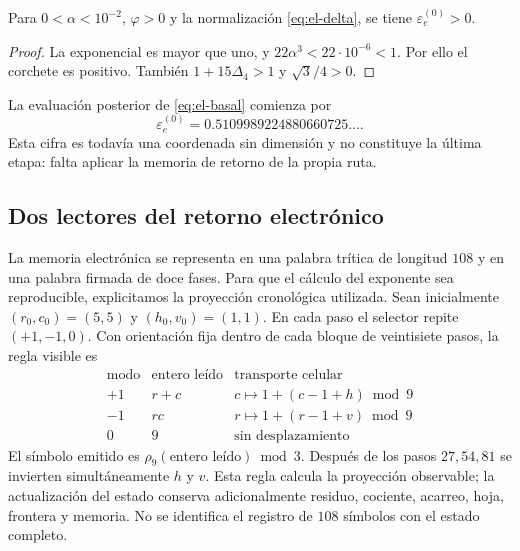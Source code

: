 \begin{proposition}
Para \(0<\alpha<10^{-2}\), \(\varphi>0\) y la normalización
\eqref{eq:el-delta}, se tiene \(\varepsilon_e^{(0)}>0\).
\end{proposition}
\begin{proof}
La exponencial es mayor que uno, y
\(22\alpha^3<22\cdot10^{-6}<1\). Por ello el corchete es positivo.
También \(1+15\Delta_4>1\) y \(\sqrt3/4>0\).
\end{proof}

La evaluación posterior de \eqref{eq:el-basal} comienza por
\[
 \varepsilon_e^{(0)}=0.5109989224880660725\ldots.
\]
Esta cifra es todavía una coordenada sin dimensión y no constituye la
última etapa: falta aplicar la memoria de retorno de la propia ruta.

\subsection{Dos lectores del retorno electrónico}

La memoria electrónica se representa en una palabra trítica de longitud
\(108\) y en una palabra firmada de doce fases. Para que el cálculo del
exponente sea reproducible, explicitamos la proyección cronológica
utilizada. Sean inicialmente
\((r_0,c_0)=(5,5)\) y \((h_0,v_0)=(1,1)\). En cada paso el selector
repite \((+1,-1,0)\). Con orientación fija dentro de cada bloque de
veintisiete pasos, la regla visible es
\[
 \begin{array}{c|c|c}
 \text{modo}&\text{entero leído}&\text{transporte celular}\\\hline
 +1&r+c&c\mapsto1+(c-1+h)\bmod9\\
 -1&rc&r\mapsto1+(r-1+v)\bmod9\\
 0&9&\text{sin desplazamiento}
 \end{array}
\]
El símbolo emitido es \(\rho_9(\text{entero leído})\bmod3\).
Después de los pasos \(27,54,81\) se invierten simultáneamente
\(h\) y \(v\). Esta regla calcula la proyección observable; la
actualización del estado conserva adicionalmente residuo, cociente,
acarreo, hoja, frontera y memoria. No se identifica el registro de
\(108\) símbolos con el estado completo.

